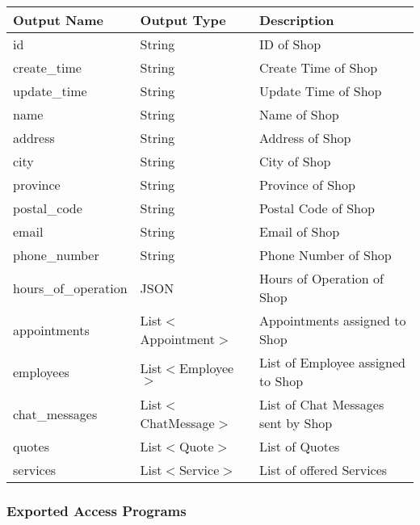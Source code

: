 \documentclass[12pt, titlepage]{article}
\begin{document}
\begin{table}[H]
	\begin{tabular}{|l|l|l|}
		\hline
		\textbf{Output Name} & \textbf{Output Type}  & \textbf{Description}               \\
		\hline
		id                   & String                & ID of Shop                         \\
		\hline
		create\_time         & String                & Create Time of Shop                \\
		\hline
		update\_time         & String                & Update Time of Shop                \\
		\hline
		name                 & String                & Name of Shop                       \\
		\hline
		address              & String                & Address of Shop                    \\
		\hline
		city                 & String                & City of Shop                       \\
		\hline
		province             & String                & Province of Shop                   \\
		\hline
		postal\_code         & String                & Postal Code of Shop                \\
		\hline
		email                & String                & Email of Shop                      \\
		\hline
		phone\_number        & String                & Phone Number of Shop               \\
		\hline
		hours\_of\_operation & JSON                  & Hours of Operation of Shop         \\
		\hline
		appointments         & List$<$Appointment$>$ & Appointments assigned to Shop      \\
		\hline
		employees            & List$<$Employee$>$    & List of Employee assigned to Shop  \\
		\hline
		chat\_messages       & List$<$ChatMessage$>$ & List of Chat Messages sent by Shop \\
		\hline
		quotes               & List$<$Quote$>$       & List of Quotes                     \\
		\hline
		services             & List$<$Service$>$     & List of offered Services           \\
		\hline
	\end{tabular}
\end{table}

\subsubsection{Exported Access Programs}
\end{document}

